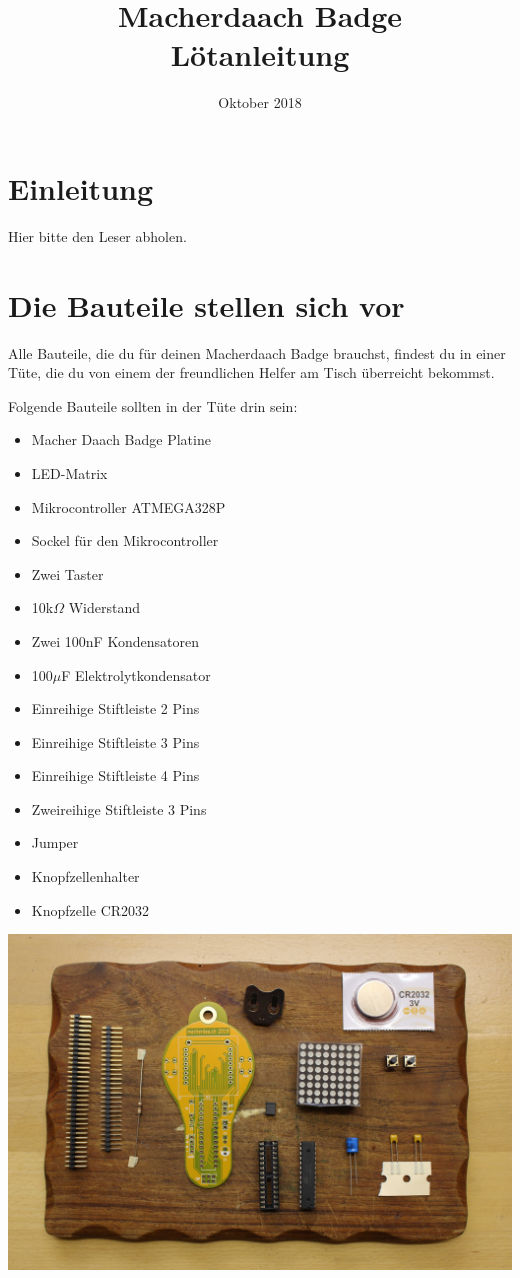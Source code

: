 \documentclass{article}
\title{Macherdaach Badge \\ Lötanleitung}
\date{Oktober 2018}
\begin{document}
\maketitle
\section{Einleitung}

Hier bitte den Leser abholen.

\section{Die Bauteile stellen sich vor}
Alle Bauteile, die du für deinen Macherdaach Badge brauchst, findest du in einer Tüte, die du von einem der freundlichen Helfer  am Tisch überreicht bekommst.

Folgende Bauteile sollten in der Tüte drin sein:

\begin{itemize}
	\item Macher Daach Badge Platine
	\item LED-Matrix
	\item Mikrocontroller ATMEGA328P
	\item Sockel für den Mikrocontroller
	\item Zwei Taster
	\item 10k$\Omega$ Widerstand
	\item Zwei 100nF Kondensatoren
	\item 100$\mu$F Elektrolytkondensator
	\item Einreihige Stiftleiste 2 Pins
	\item Einreihige Stiftleiste 3 Pins
	\item Einreihige Stiftleiste 4 Pins
	\item Zweireihige Stiftleiste 3 Pins
	\item Jumper
	\item Knopfzellenhalter
	\item Knopfzelle CR2032
\end{itemize}



\begin{center}
\includegraphics[width=\textwidth]{Bilder/IMG_5537.JPG}
\label{fig:all_components}
\end{center}
\end{document}
